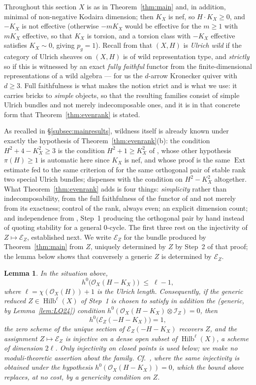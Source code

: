 \documentclass{amsart}
\newtheorem{lemma}[theorem]{Lemma}
\theoremstyle{definition}
\newcommand{\OO}{\mathcal{O}}
\newcommand{\EE}{\mathcal{E}}
\newcommand{\II}{\mathcal{I}}
\newcommand{\Hilb}{\operatorname{Hilb}}
\newcommand{\Ext}{\operatorname{Ext}}
\newcommand{\len}{\ell}
\begin{document}
Throughout this section $X$ is as in Theorem~\ref{thm:main} and, in addition, minimal of non-negative Kodaira dimension; then $K_X$ is nef, so $H\cdot K_X\ge0$, and $-K_X$ is not effective (otherwise $-mK_X$ would be effective for the $m\ge1$ with $mK_X$ effective, so that $K_X$ is torsion, and a torsion class with $-K_X$ effective satisfies $K_X\sim0$, giving $p_g=1$). Recall from \cite{FPL,CasWild} that $(X,H)$ is \emph{Ulrich wild} if the category of Ulrich sheaves on $(X,H)$ is of wild representation type, and \emph{strictly} so if this is witnessed by an exact \emph{fully faithful} functor from the finite-dimensional representations of a wild algebra --- for us the $d$-arrow Kronecker quiver with $d\ge3$. Full faithfulness is what makes the notion strict and is what we use: it carries bricks to \emph{simple} objects, so that the resulting families consist of simple Ulrich bundles and not merely indecomposable ones, and it is in that concrete form that Theorem~\ref{thm:evenrank} is stated.

As recalled in \S\ref{subsec:mainresults}, wildness itself is already known under exactly the hypothesis of Theorem~\ref{thm:evenrank}(b): the condition $H^2+4-K_X^2\ge3$ is the condition $H^2+1\ge K_X^2$ of \cite[Lem.~5.2]{Cas17}, whose other hypothesis $\pi(H)\ge1$ is automatic here since $K_X$ is nef, and whose proof is the same $\Ext$ estimate fed to the same criterion of \cite{FPL} for the same orthogonal pair of stable rank two special Ulrich bundles; \cite[Thm.~1.3]{Cas17} dispenses with the condition on $H^2-K_X^2$ altogether. What Theorem~\ref{thm:evenrank} adds is four things: \emph{simplicity} rather than indecomposability, from the full faithfulness of the functor of \cite{FPL} and not merely from its exactness; control of the rank, always even; an explicit dimension count; and independence from \cite[Thm.~1.2]{Cas17}, Step~1 producing the orthogonal pair by hand instead of quoting stability for a general $0$-cycle. The first three rest on the injectivity of $Z\mapsto\EE_Z$, established next. We write $\EE_Z$ for the bundle produced by Theorem~\ref{thm:main} from $Z$, uniquely determined by $Z$ by Step~2 of that proof; the lemma below shows that conversely a generic $Z$ is determined by $\EE_Z$.

\begin{lemma}\label{lem:noniso}
In the situation above,
\[
h^0\bigl(\OO_X(H-K_X)\bigr)\;\le\;\len-1 ,
\]
where $\len=\chi(\OO_X(H))+1$ is the Ulrich length. Consequently, if the generic reduced $Z\in\Hilb^{\len}(X)$ of Step~1 is chosen to satisfy in addition the (generic, by Lemma~\ref{lem:LQ24}) condition $h^0(\OO_X(H-K_X)\otimes\II_Z)=0$, then
\[
h^0\bigl(\EE_Z(-H-K_X)\bigr)=1 ,
\]
the zero scheme of the unique section of $\EE_Z(-H-K_X)$ recovers $Z$, and the assignment $Z\mapsto\EE_Z$ is injective on a dense open subset of $\Hilb^{\len}(X)$, a scheme of dimension $2\len$. Only injectivity on closed points is used below; we make no moduli-theoretic assertion about the family. Cf.\ \cite[Rem.~4.5]{Cas17}, where the same injectivity is obtained under the hypothesis $h^0(\OO_X(H-K_X))=0$, which the bound above replaces, at no cost, by a genericity condition on $Z$.
\end{lemma}
\end{document}

